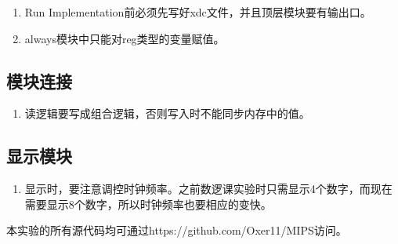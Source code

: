 \documentclass[twocolumn]{article} %
\begin{document}
\begin{sloppypar}
\begin{enumerate}
\item Run Implementation前必须先写好xdc文件，并且顶层模块要有输出口。
\item always模块中只能对reg类型的变量赋值。
\end{enumerate}

\subsection{模块连接}

\begin{enumerate}
\item 读逻辑要写成组合逻辑，否则写入时不能同步内存中的值。
\end{enumerate}

\subsection{显示模块}

\begin{enumerate}
\item 显示时，要注意调控时钟频率。之前数逻课实验时只需显示4个数字，而现在需要显示8个数字，所以时钟频率也要相应的变快。
\end{enumerate}

{\color{red} 本实验的所有源代码均可通过https://github.com/Oxer11/MIPS访问。}
\end{sloppypar}
\end{document}
